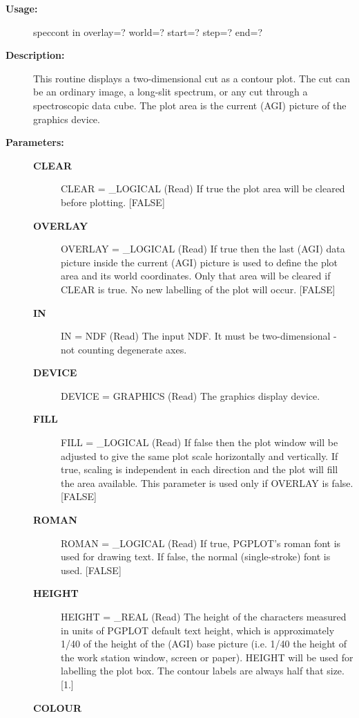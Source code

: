 \begin{description}

\item [\textbf{Usage:}]

   speccont in overlay=? world=? start=? step=? end=?


\item [\textbf{Description:}]

   This routine displays a two-dimensional cut as a contour plot. The
   cut can be an ordinary image, a long-slit spectrum, or any cut
   through a spectroscopic data cube. The plot area is the current
   (AGI) picture of the graphics device.


\item [\textbf{Parameters:}]
\begin{description}
\item [\textbf{CLEAR}]
CLEAR = \_LOGICAL (Read)
   If true the plot area will be cleared before plotting. [FALSE]
\item [\textbf{OVERLAY}]
OVERLAY = \_LOGICAL (Read)
   If true then the last (AGI) data picture inside the current
   (AGI) picture is used to define the plot area and its world
   coordinates. Only that area will be cleared if CLEAR is true.
   No new labelling of the plot will occur. [FALSE]
\item [\textbf{IN}]
IN = NDF (Read)
   The input NDF. It must be two-dimensional - not counting
   degenerate axes.
\item [\textbf{DEVICE}]
DEVICE = GRAPHICS (Read)
   The graphics display device.
\item [\textbf{FILL}]
FILL = \_LOGICAL (Read)
   If false then the plot window will be adjusted to give the same
   plot scale horizontally and vertically. If true, scaling is
   independent in each direction and the plot will fill the area
   available. This parameter is used only if OVERLAY is false.
   [FALSE]
\item [\textbf{ROMAN}]
ROMAN = \_LOGICAL (Read)
   If true, PGPLOT's roman font is used for drawing text.  If
   false, the normal (single-stroke) font is used. [FALSE]
\item [\textbf{HEIGHT}]
HEIGHT = \_REAL (Read)
   The height of the characters measured in units of PGPLOT
   default text height, which is approximately 1/40 of the height
   of the (AGI) base picture (i.e. 1/40 the height of the
   work station window, screen or paper). HEIGHT will be used for
   labelling the plot box. The contour labels are always half that
   size. [1.]
\item [\textbf{COLOUR}]

\end{description}
\end{description}
